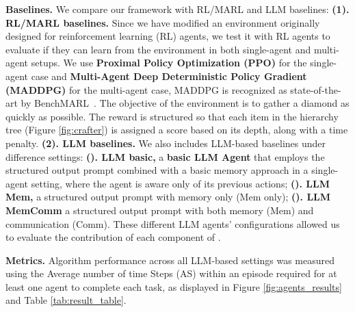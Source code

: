 \textbf{Baselines.} We compare our framework with RL/MARL and LLM baselines: \textbf{(1). RL/MARL baselines. }Since we have modified an environment originally designed for reinforcement learning (RL) agents, we test it with RL agents to evaluate if they can learn from the environment in both single-agent and multi-agent setups. We use \textbf{Proximal Policy Optimization (PPO)} for the single-agent case and \textbf{Multi-Agent Deep Deterministic Policy Gradient (MADDPG)} for the multi-agent case, MADDPG is recognized as state-of-the-art by BenchMARL~\cite{bettini2024benchmarlbenchmarkingmultiagentreinforcement}. The objective of the environment is to gather a diamond as quickly as possible. The reward is structured so that each item in the hierarchy tree (Figure \ref{fig:crafter}) is assigned a score based on its depth, along with a time penalty. \textbf{(2). LLM baselines. }
We also includes LLM-based baselines under difference settings: \textbf{(). LLM basic,} a \textbf{basic LLM Agent} that employs the structured output prompt combined with a basic memory approach in a single-agent setting, where the agent is aware only of its previous actions; \textbf{(). LLM Mem,} a structured output prompt with memory only (Mem only); \textbf{(). LLM MemComm} a structured output prompt with both memory (Mem) and communication (Comm). These different LLM agents' configurations allowed us to evaluate the contribution of each component of \framework. 

\textbf{Metrics.} Algorithm performance across all LLM-based settings was measured using the Average number of time Steps (AS) within an episode required for at least one agent to complete each task, as displayed in Figure \ref{fig:agents_results} and Table \ref{tab:result_table}.






